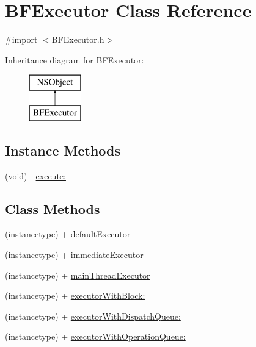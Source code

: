 \hypertarget{interface_b_f_executor}{}\section{B\+F\+Executor Class Reference}
\label{interface_b_f_executor}


{\ttfamily \#import $<$B\+F\+Executor.\+h$>$}

Inheritance diagram for B\+F\+Executor\+:\begin{figure}[H]
\begin{center}
\leavevmode
\includegraphics[height=2.000000cm]{interface_b_f_executor}
\end{center}
\end{figure}
\subsection*{Instance Methods}
\begin{DoxyCompactItemize}
\item 
(void) -\/ \hyperlink{interface_b_f_executor_a32faf486dcdd09b6895cc337f65060e0}{execute\+:}
\end{DoxyCompactItemize}
\subsection*{Class Methods}
\begin{DoxyCompactItemize}
\item 
(instancetype) + \hyperlink{interface_b_f_executor_a81eae8cce462b2611cbf9a8117f11f9b}{default\+Executor}
\item 
(instancetype) + \hyperlink{interface_b_f_executor_aa09657f4258410d0d8265e0656d96b4e}{immediate\+Executor}
\item 
(instancetype) + \hyperlink{interface_b_f_executor_a63e1382c4dbdcb36ba971e7cbf2cc439}{main\+Thread\+Executor}
\item 
(instancetype) + \hyperlink{interface_b_f_executor_a4b739b49457cdea9c30e9ac0a2b29a57}{executor\+With\+Block\+:}
\item 
(instancetype) + \hyperlink{interface_b_f_executor_aedce1a2c68d49f9218b086f431edcc3f}{executor\+With\+Dispatch\+Queue\+:}
\item 
(instancetype) + \hyperlink{interface_b_f_executor_afa8edfb15d7a47fa4c7ed4394731d716}{executor\+With\+Operation\+Queue\+:}
\end{DoxyCompactItemize}


